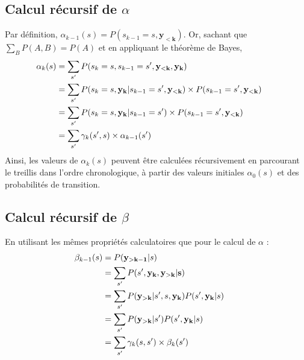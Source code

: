 \subsection{Calcul récursif de $\alpha$}
Par définition, $\alpha_{k-1}(s) = P(s_{k-1}=s,\mathbf{y_{<k}})$. Or, sachant que $\sum\limits_B P(A,B) = P(A)$ et en appliquant le théorème de Bayes,
\begin{align*}
	\hspace*{-4ex}
	\alpha_k(s) & = \sum\limits_{s'}P(s_{k}=s,s_{k-1}=s',\mathbf{y_{<k}},\mathbf{y_k})                                        \\
	            & = \sum\limits_{s'}P(s_{k}=s,\mathbf{y_k} | s_{k-1}=s',\mathbf{y_{<k}}) \times P(s_{k-1}=s',\mathbf{y_{<k}}) \\
	            & = \sum\limits_{s'}P(s_{k}=s,\mathbf{y_k} | s_{k-1}=s') \times P(s_{k-1}=s',\mathbf{y_{<k}})                 \\
	            & = \sum\limits_{s'}\gamma_k(s',s)\times \alpha_{k-1}(s')                                                     
\end{align*}
Ainsi, les valeurs de $\alpha_k(s)$ peuvent être calculées récursivement en parcourant le treillis dans l'ordre chronologique, à partir des valeurs initiales $\alpha_0(s)$ et des probabilités de transition.

\subsection{Calcul récursif de $\beta$}
En utilisant les mêmes propriétés calculatoires que pour le calcul de $\alpha$ : 
\begin{align*}
	\hspace*{-4ex}
	\beta_{k-1}(s) & = P(\mathbf{y_{>k-1}}|s)                                                             \\
	               & = \sum\limits_{s'}P(s',\mathbf{y_{k}},\mathbf{y_{>k}|s})                             \\
	               & = \sum\limits_{s'}P(\mathbf{y_{>k}} | s',s, \mathbf{y_{k}}) P(s', \mathbf{y_{k}}| s) \\
	               & = \sum\limits_{s'}P(\mathbf{y_{>k}} | s') P(s', \mathbf{y_{k}}| s)                   \\
	               & = \sum\limits_{s'}\gamma_k(s,s')\times \beta_{k}(s')                                 
\end{align*}


